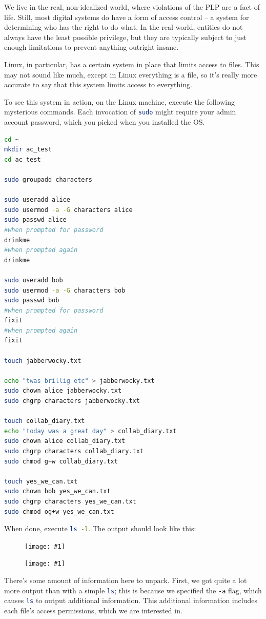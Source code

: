 \documentclass{article}
\newcommand{\displayimage}[1] {
\begin{figure}[H]
    \centering
    \texttt{[image: \#1]} 
\end{figure}
}
\newcommand{\wrapimageright}[1] {
    \begin{figure}
        \begin{center}
            \texttt{[image: \#1]} 
        \end{center}
    \end{figure}
}
\newcommand{\xcode}[2]{\colorbox{ubuntuback}{\lstinline[language=#1]|#2|}}
\begin{document}
We live in the real, non-idealized world, where violations of the PLP are a fact of life. Still, most digital systems do have a form of access control -- a system for determining who has the right to do what. In the real world, entities do not always have the least possible privilege, but they are typically subject to just enough limitations to prevent anything outright insane.

Linux, in particular, has a certain system in place that limits access to files. This may not sound like much, except in Linux everything is a file, so it's really more accurate to say that this system limits access to everything.

To see this system in action, on the Linux machine, execute the following mysterious commands. Each invocation of \xcode{bash}{sudo} might require your admin account password, which you picked when you installed the OS.
\begin{lstlisting}[language=bash]
cd ~
mkdir ac_test
cd ac_test

sudo groupadd characters

sudo useradd alice
sudo usermod -a -G characters alice
sudo passwd alice
#when prompted for password
drinkme
#when prompted again
drinkme

sudo useradd bob
sudo usermod -a -G characters bob
sudo passwd bob
#when prompted for password
fixit
#when prompted again
fixit

touch jabberwocky.txt

echo "twas brillig etc" > jabberwocky.txt
sudo chown alice jabberwocky.txt
sudo chgrp characters jabberwocky.txt

touch collab_diary.txt
echo "today was a great day" > collab_diary.txt
sudo chown alice collab_diary.txt
sudo chgrp characters collab_diary.txt
sudo chmod g+w collab_diary.txt

touch yes_we_can.txt
sudo chown bob yes_we_can.txt
sudo chgrp characters yes_we_can.txt
sudo chmod og+w yes_we_can.txt
\end{lstlisting}

When done, execute \xcode{bash}{ls -l}. The output should look like this: 

\displayimage{./images/access_control_file_list.png}

\wrapimageright{./images/file_permissions_how_to_read.png}
There's some amount of information here to unpack. First, we got quite a lot more output than with a simple \xcode{bash}{ls}; this is because we specified the \xcode{bash}{-a} flag, which causes \xcode{bash}{ls} to output additional information. This additional information includes each file's access permissions, which we are interested in.
\end{document}
